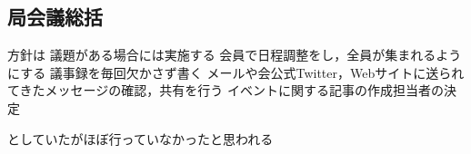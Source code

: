 \subsection*{局会議総括}


方針は
    議題がある場合には実施する
    会員で日程調整をし，全員が集まれるようにする
    議事録を毎回欠かさず書く
    メールや会公式Twitter，Webサイトに送られてきたメッセージの確認，共有を行う
    イベントに関する記事の作成担当者の決定

としていたがほぼ行っていなかったと思われる
